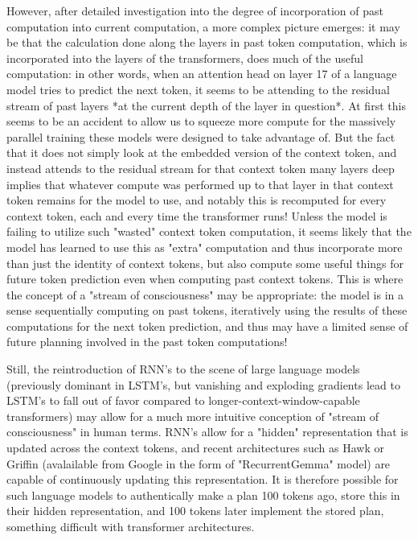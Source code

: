 \documentclass{article}
\begin{document}
However, after detailed investigation into the degree of incorporation of past computation into current computation, a more complex picture emerges: it may be that the calculation done along the layers in past token computation, which is incorporated into the layers of the transformers, does much of the useful computation: in other words, when an attention head on layer 17 of a language model tries to predict the next token, it seems to be attending to the residual stream of past layers *at the current depth of the layer in question*. At first this seems to be an accident to allow us to squeeze more compute for the massively parallel training these models were designed to take advantage of. But the fact that it does not simply look at the embedded version of the context token, and instead attends to the residual stream for that context token many layers deep implies that whatever compute was performed up to that layer in that context token remains for the model to use, and notably this is recomputed for every context token, each and every time the transformer runs! Unless the model is failing to utilize such "wasted" context token computation, it seems likely that the model has learned to use this as "extra" computation and thus incorporate more than just the identity of context tokens, but also compute some useful things for future token prediction even when computing past context tokens. This is where the concept of a "stream of consciousness" may be appropriate: the model is in a sense sequentially computing on past tokens, iteratively using the results of these computations for the next token prediction, and thus may have a limited sense of future planning involved in the past token computations!

Still, the reintroduction of RNN's to the scene of large language models (previously dominant in LSTM's, but vanishing and exploding gradients lead to LSTM's to fall out of favor compared to longer-context-window-capable transformers) may allow for a much more intuitive conception of "stream of consciousness" in human terms. RNN's allow for a "hidden" representation that is updated across the context tokens, and recent architectures such as Hawk or Griffin \citep{de2024griffinmixinggatedlinear} (avalailable from Google in the form of "RecurrentGemma" model) are capable of continuously updating this representation. It is therefore possible for such language models to authentically make a plan 100 tokens ago, store this in their hidden representation, and 100 tokens later implement the stored plan, something difficult with transformer architectures.
\end{document}
